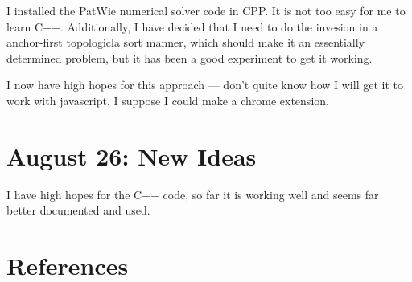 \documentclass[11pt]{article}
\begin{document}
I installed the PatWie numerical solver code in CPP.
It is not too easy for me to learn C++.  Additionally,
I have decided that I need to do the invesion in a anchor-first
topologicla sort manner, which should make it an essentially
determined problem, but it has been a good experiment to get it working.

I now have high hopes for this approach --- don't quite know how
I will get it to work with javascript.  I suppose I could make
a chrome extension.

\section{August 26: New Ideas}

I have high hopes for the C++ code, so far it is working well and seems
far better documented and used.


\section{References}
\end{document}
